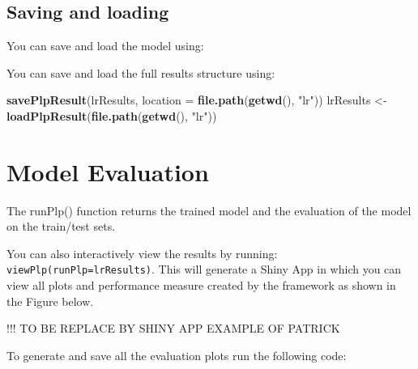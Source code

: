 \documentclass[]{article}
\newenvironment{Shaded}{\begin{snugshade}}{\end{snugshade}}
\newcommand{\KeywordTok}[1]{\textcolor[rgb]{0.13,0.29,0.53}{\textbf{#1}}}
\newcommand{\DataTypeTok}[1]{\textcolor[rgb]{0.13,0.29,0.53}{#1}}
\newcommand{\StringTok}[1]{\textcolor[rgb]{0.31,0.60,0.02}{#1}}
\newcommand{\OperatorTok}[1]{\textcolor[rgb]{0.81,0.36,0.00}{\textbf{#1}}}
\newcommand{\NormalTok}[1]{#1}
\begin{document}
\subsection{Saving and loading}\label{saving-and-loading}

You can save and load the model using:

\begin{Shaded}
\end{Shaded}

You can save and load the full results structure using:

\begin{Shaded}
\begin{Highlighting}[]
\KeywordTok{savePlpResult}\NormalTok{(lrResults, }\DataTypeTok{location =} \KeywordTok{file.path}\NormalTok{(}\KeywordTok{getwd}\NormalTok{(), }\StringTok{"lr"}\NormalTok{))}
\NormalTok{lrResults <-}\StringTok{ }\KeywordTok{loadPlpResult}\NormalTok{(}\KeywordTok{file.path}\NormalTok{(}\KeywordTok{getwd}\NormalTok{(), }\StringTok{"lr"}\NormalTok{))}
\end{Highlighting}
\end{Shaded}

\newpage

\section{Model Evaluation}\label{model-evaluation}

The runPlp() function returns the trained model and the evaluation of
the model on the train/test sets.

You can also interactively view the results by running:
\texttt{viewPlp(runPlp=lrResults)}. This will generate a Shiny App in
which you can view all plots and performance measure created by the
framework as shown in the Figure below.

!!! TO BE REPLACE BY SHINY APP EXAMPLE OF PATRICK

To generate and save all the evaluation plots run the following code:
\end{document}
